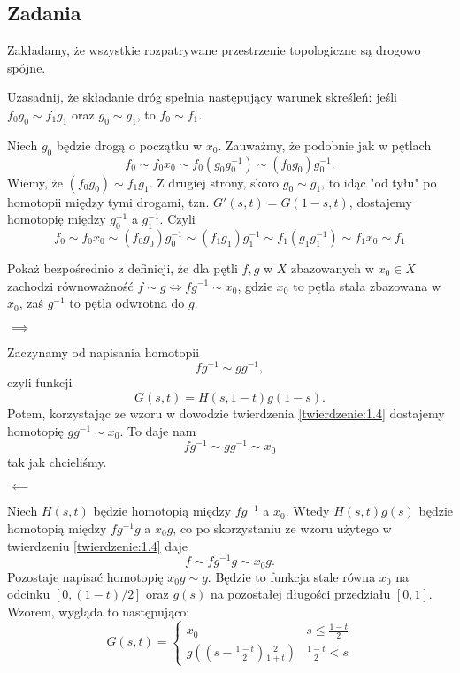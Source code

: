 \subsection{Zadania}

Zakładamy, że wszystkie rozpatrywane przestrzenie topologiczne są drogowo spójne.

\begin{problem}
  Uzasadnij, że składanie dróg spełnia następujący warunek skreśleń: jeśli $f_0g_0\sim f_1g_1$ oraz $g_0\sim g_1$, to $f_0\sim f_1$.
\end{problem}

\begin{solution}
  Niech $g_0$ będzie drogą o początku w $x_0$. Zauważmy, że podobnie jak w pętlach
  $$f_0\sim f_0 x_0\sim f_0(g_0g_0^{-1})\sim (f_0g_0)g_0^{-1}.$$
  Wiemy, że $(f_0g_0)\sim f_1g_1$. Z drugiej strony, skoro $g_0\sim g_1$, to idąc "od tyłu" po homotopii między tymi drogami, tzn. $G'(s, t)=G(1-s, t)$, dostajemy homotopię między $g_0^{-1}$ a $g_1^{-1}$. Czyli
  $$f_0\sim f_0x_0\sim (f_0g_0)g_0^{-1}\sim (f_1g_1)g_1^{-1}\sim f_1(g_1g_1^{-1})\sim f_1x_0\sim f_1$$
\end{solution}

\begin{problem}
  Pokaż bezpośrednio z definicji, że dla pętli $f,g$ w $X$ zbazowanych w $x_0\in X$ zachodzi równoważność $f\sim g\iff f g^{-1}\sim x_0$, gdzie $x_0$ to pętla stała zbazowana w $x_0$, zaś $g^{-1}$ to pętla odwrotna do $g$.
\end{problem}

\begin{solution}
  $\implies$
  
  Zaczynamy od napisania homotopii 
  $$fg^{-1} \sim gg^{-1},$$ 
  czyli funkcji
  $$G(s, t)=H(s, 1-t)g(1-s).$$ 
  Potem, korzystając ze wzoru w dowodzie twierdzenia \ref{twierdzenie:1.4} dostajemy homotopię $gg^{-1}\sim x_0$. To daje nam 
  $$fg^{-1}\sim gg^{-1}\sim x_0$$ 
  tak jak chcieliśmy.

  $\impliedby$

  Niech $H(s, t)$ będzie homotopią między $fg^{-1}$ a $x_0$. Wtedy $H(s, t)g(s)$ będzie homotopią między $fg^{-1}g$ a $x_0g$, co po skorzystaniu ze wzoru użytego w twierdzeniu \ref{twierdzenie:1.4} daje
  $$f\sim fg^{-1}g\sim x_0g.$$
  Pozostaje napisać homotopię $x_0g\sim g$. Będzie to funkcja stale równa $x_0$ na odcinku $[0, (1-t)/2]$ oraz $g(s)$ na pozostałej długości przedziału $[0,1]$. Wzorem, wygląda to następująco:
  $$G(s, t)=\begin{cases}
  x_0&s\leq \frac{1-t}{2}\\ g\left(\left(s-\frac{1-t}{2}\right)\frac{2}{1+t}\right)&\frac{1-t}{2}<s\end{cases}$$
\end{solution}
